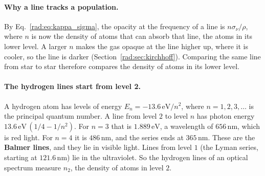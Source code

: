 \paragraph{Why a line tracks a population.} By Eq.~\eqref{rad:eq:kappa_sigma}, the opacity at the frequency of a line is $n\sigma_\nu/\rho$, where $n$ is now the density of atoms that can absorb that line, the atoms in its lower level. A larger $n$ makes the gas opaque at the line higher up, where it is cooler, so the line is darker (Section~\ref{rad:sec:kirchhoff}). Comparing the same line from star to star therefore compares the density of atoms in its lower level.

\paragraph{The hydrogen lines start from level 2.} A hydrogen atom has levels of energy $E_n=-13.6\,\mathrm{eV}/n^2$, where $n=1,2,3,\ldots$ is the principal quantum number. A line from level $2$ to level $n$ has photon energy $13.6\,\mathrm{eV}\,(1/4-1/n^2)$. For $n=3$ that is $1.889\,\mathrm{eV}$, a wavelength of $656\,\mathrm{nm}$, which is red light. For $n=4$ it is $486\,\mathrm{nm}$, and the series ends at $365\,\mathrm{nm}$. These are the \textbf{Balmer lines}, and they lie in visible light. Lines from level $1$ (the Lyman series, starting at $121.6\,\mathrm{nm}$) lie in the ultraviolet. So the hydrogen lines of an optical spectrum measure $n_2$, the density of atoms in level $2$.

